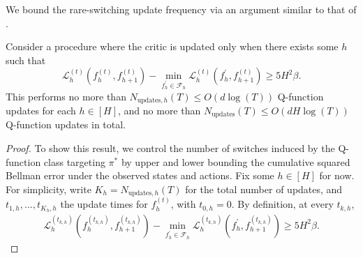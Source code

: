 We bound the rare-switching update frequency via an argument similar to that of \citet{xiong2023generalframeworksequentialdecisionmaking}. 
\begin{lem}
    Consider a procedure where the critic is updated only when there exists some $h$ such that $$\mathcal{L}_h^{(t)}(f_h^{(t)}, f_{h+1}^{(t)})-\min _{f_h^{\prime} \in \mathcal{F}_h} \mathcal{L}_h^{(t)}(f_h^{\prime}, f_{h+1}^{(t)}) \geq 5H^2\beta.$$ 
    This performs no more than $N_{\text{updates}, h}(T) \leq O(d\log(T))$ Q-function updates for each $h \in [H]$, and no more than $N_{\text{updates}}(T) \leq O(dH\log(T))$ Q-function updates in total.
    \label{lem:switch-cost}
\end{lem}
\begin{proof}
    To show this result, we control the number of switches induced by the Q-function class targeting $\pi^*$ by upper and lower bounding the cumulative squared Bellman error under the observed states and actions. Fix some $h \in [H]$ for now. For simplicity, write $K_h = N_{\text{updates},h}(T)$ for the total number of updates, and $t_{1,h},...,t_{K_h,h}$ the update times for $f_h^{(t)}$, with $t_{0,h} = 0$. By definition, at every $t_{k,h}$,
    \begin{align}\mathcal{L}_h^{(t_{k,h})}\left(f_h^{(t_{k,h})}, f_{h+1}^{(t_{k,h})}\right)-\min _{f_h^{\prime} \in \mathcal{F}_h} \mathcal{L}_h^{(t_{k,h})}\left(f_h^{\prime}, f_{h+1}^{(t_{k,h})}\right) \geq 5 H^2 \beta.\end{align}


\end{proof}
